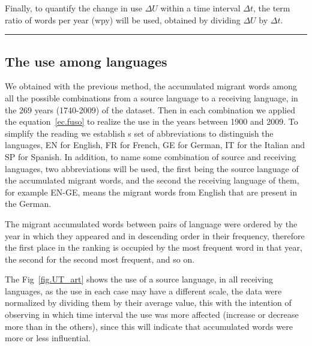 \documentclass[10pt,letterpaper]{article} %
\begin{document}
Finally, to quantify the change in use  $\Delta U$ within a time interval $\Delta t$, the term ratio of words per year (wpy) will be used, obtained by dividing $\Delta U$ by $\Delta t$.
\noindent\rule{10cm}{0.4pt}


\subsection*{The use among languages} %

We obtained with the previous method, the accumulated migrant words among all the possible combinations from a source language to a receiving language, in the 269 years (1740-2009) of the dataset. Then in each combination we applied the equation~\ref{ec.fuso} to realize the use in the years between 1900 and 2009. To simplify the reading we establish s set of abbreviations to distinguish the languages, EN for English, FR for French, GE for German, IT for the Italian and SP for Spanish. In addition, to name some combination of source  and receiving languages, two abbreviations will be used, the first being the source language of the accumulated migrant words, and the second the receiving language of them, for example EN-GE, means the migrant words from English that are present in the German.

The migrant accumulated words between pairs of language were ordered by the year in which they appeared and in descending order in their frequency, therefore the first place in the ranking is occupied by the most frequent word in that year, the second for the second most frequent, and so on.

The Fig~\ref{fig.UT_art} shows the use of a source language, in all receiving languages, as the use in each case may have a different scale, the data were normalized by dividing them by their average value, this with the intention of observing in which time interval the use was more affected (increase or decrease more than in the others), since this will indicate that accumulated words were more or less influential. 
\end{document}
